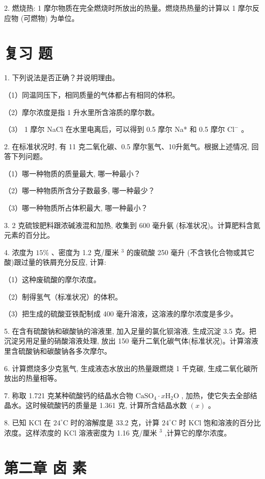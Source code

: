 \documentclass[10pt]{article}
\begin{document}
2. 燃烧热: 1 摩尔物质在完全燃烧时所放出的热量。燃烧热热量的计算以 1 摩尔反应物 (可燃物) 为单位。

\section*{复习 题}

1. 下列说法是否正确？并说明理由。

（1）同温同压下，相同质量的气体都占有相同的体积。

（2）摩尔浓度是指 1 升水里所含溶质的摩尔数。

（3） 1 摩尔 NaCl 在水里电离后，可以得到 0.5 摩尔 Na* 和 0.5 摩尔 \({\mathrm{{Cl}}}^{ - }\) 。

2. 在标准状况时, 有 11 克二氧化碳、0.5 摩尔氢气、10升氮气。根据上述情况, 回答下列问题。

（1）哪一种物质的质量最大, 哪一种最小？

（2）哪一种物质所含分子数最多, 哪一种最少？

（3）哪一种物质所占体积最大, 哪一种最小？

3. 2 克硫铵肥料跟浓碱液混和加热, 收集到 600 毫升氨 (标准状况)。计算肥料含氮元素的百分比。

4. 浓度为 \({15}\%\) 、密度为 1.2 克/厘米 \({}^{3}\) 的废硫酸 250 毫升 (不含铁化合物或其它酸)跟过量的铁屑充分反应, 计算:

（1）这种废硫酸的摩尔浓度。

（2）制得氢气（标准状况）的体积。

（3）把生成的硫酸亚铁配制成 400 毫升溶液，这溶液的摩尔浓度是多少。

5. 在含有硫酸钠和碳酸钠的溶液里, 加入足量的氯化钡溶液, 生成沉淀 3.5 克。把沉淀另用足量的硝酸溶液处理, 放出 150 毫升二氧化碳气体(标准状况)。计算溶液里含硫酸钠和碳酸钠各多次摩尔。

6. 计算燃烧多少克氢气, 生成液态水放出的热量跟燃烧 1 千克碳, 生成二氧化碳所放出的热量相等。

7. 称取 1.721 克某种硫酸钙的结晶水合物 \({\mathrm{{CaSO}}}_{4} \cdot x{\mathrm{H}}_{2}\mathrm{O}\) , 加热，使它失去全部结晶水。这时候硫酸钙的质量是 1.361 克, 计算所含结晶水数 \(\left( x\right)\) 。

8. 已知 \(\mathrm{{KCl}}\) 在 \({24}^{ \circ }\mathrm{C}\) 时的溶解度是 33.2 克，计算 \({24}^{ \circ }\mathrm{C}\) 时 \(\mathrm{{KCl}}\) 饱和溶液的百分比浓度。这样浓度的 \(\mathrm{{KCl}}\) 溶液密度为 1.16 克/厘米 \({}^{3}\) ,计算它的摩尔浓度。

\section*{第二章 卤 素}
\end{document}
